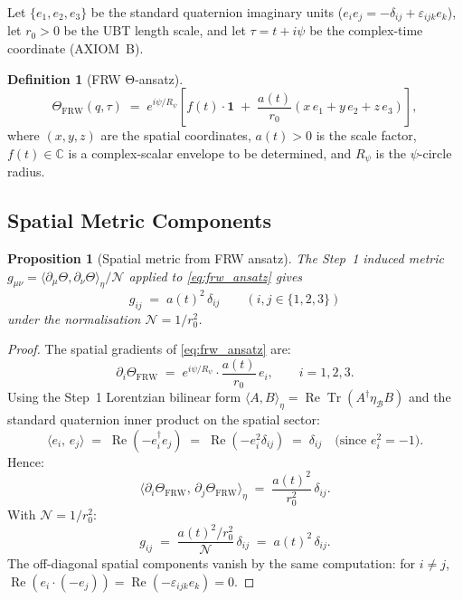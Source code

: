 \documentclass[12pt,a4paper]{article}
\newtheorem{proposition}[theorem]{Proposition}
\theoremstyle{definition}
\newtheorem{definition}[theorem]{Definition}
\theoremstyle{remark}
\begin{document}
Let $\{e_1, e_2, e_3\}$ be the standard quaternion imaginary units
($e_i e_j = -\delta_{ij} + \varepsilon_{ijk}e_k$),
let $r_0 > 0$ be the UBT length scale, and let $\tau = t + i\psi$ be
the complex-time coordinate (AXIOM~B).

\begin{definition}[FRW Θ-ansatz]
\label{def:frw_ansatz}
\begin{equation}
  \label{eq:frw_ansatz}
  \Theta_{\mathrm{FRW}}(q,\tau)
  \;=\;
  e^{i\psi/R_\psi}\!\left[
    f(t)\cdot\mathbf{1}
    \;+\;
    \frac{a(t)}{r_0}\!\left(x\,e_1 + y\,e_2 + z\,e_3\right)
  \right],
\end{equation}
where $(x,y,z)$ are the spatial coordinates, $a(t)>0$ is the scale factor,
$f(t)\in\mathbb{C}$ is a complex-scalar envelope to be determined, and
$R_\psi$ is the $\psi$-circle radius.
\end{definition}

\subsection{Spatial Metric Components}

\begin{proposition}[Spatial metric from FRW ansatz]
\label{prop:spatial_metric}
The Step~1 induced metric $g_{\mu\nu} = \langle\partial_\mu\Theta,\partial_\nu\Theta\rangle_\eta/\mathcal{N}$
applied to \eqref{eq:frw_ansatz} gives
\begin{equation}
  \label{eq:gij_result}
  g_{ij} \;=\; a(t)^2\,\delta_{ij}
  \qquad (i,j \in \{1,2,3\})
\end{equation}
under the normalisation $\mathcal{N} = 1/r_0^2$.
\end{proposition}

\begin{proof}
The spatial gradients of \eqref{eq:frw_ansatz} are:
\begin{equation}
  \partial_i\Theta_{\mathrm{FRW}}
  \;=\;
  e^{i\psi/R_\psi}\cdot\frac{a(t)}{r_0}\,e_i,
  \qquad i=1,2,3.
\end{equation}
Using the Step~1 Lorentzian bilinear form
$\langle A,B\rangle_\eta = \operatorname{Re}\operatorname{Tr}(A^\dagger\eta_{\mathcal{B}}B)$
and the standard quaternion inner product on the spatial sector:
\begin{equation}
  \langle e_i,\,e_j\rangle
  \;=\;
  \operatorname{Re}(-e_i^\dagger e_j)
  \;=\;
  \operatorname{Re}(-e_i^2\delta_{ij})
  \;=\;
  \delta_{ij}
  \quad\text{(since }e_i^2=-1\text{)}.
\end{equation}
Hence:
\begin{equation}
  \langle\partial_i\Theta_{\mathrm{FRW}},\,\partial_j\Theta_{\mathrm{FRW}}\rangle_\eta
  \;=\;
  \frac{a(t)^2}{r_0^2}\,\delta_{ij}.
\end{equation}
With $\mathcal{N} = 1/r_0^2$:
\begin{equation}
  g_{ij}
  \;=\;
  \frac{a(t)^2/r_0^2}{\mathcal{N}}\,\delta_{ij}
  \;=\;
  a(t)^2\,\delta_{ij}.
\end{equation}
The off-diagonal spatial components vanish by the same computation:
for $i\neq j$, $\operatorname{Re}(e_i\cdot(-e_j)) = \operatorname{Re}(-\varepsilon_{ijk}e_k) = 0$.
\end{proof}
\end{document}
